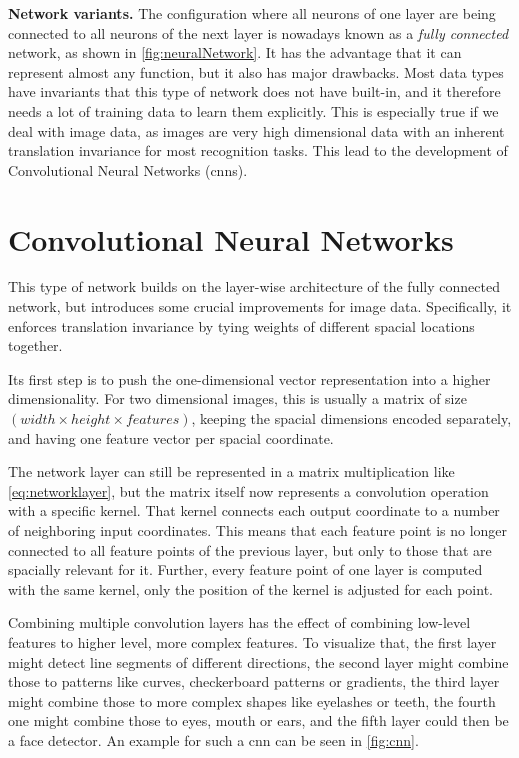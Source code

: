 \textbf{Network variants.} The configuration where all neurons of one layer are being connected to all neurons of the next layer is nowadays known as a \emph{fully connected} network, as shown in \cref{fig:neuralNetwork}. It has the advantage that it can represent almost any function, but it also has major drawbacks. Most data types have invariants that this type of network does not have built-in, and it therefore needs a lot of training data to learn them explicitly. This is especially true if we deal with image data, as images are very high dimensional data with an inherent translation invariance for most recognition tasks. This lead to the development of Convolutional Neural Networks (\glspl{cnn}).

\section{Convolutional Neural Networks}
This type of network builds on the layer-wise architecture of the fully connected network, but introduces some crucial improvements for image data. Specifically, it enforces translation invariance by tying weights of different spacial locations together.

Its first step is to push the one-dimensional vector representation into a higher dimensionality. For two dimensional images, this is usually a matrix of size $(width \times height \times features)$, keeping the spacial dimensions encoded separately, and having one feature vector per spacial coordinate.

The network layer can still be represented in a matrix multiplication like \cref{eq:networklayer}, but the matrix itself now represents a convolution operation with a specific kernel. That kernel connects each output coordinate to a number of neighboring input coordinates. This means that each feature point is no longer connected to all feature points of the previous layer, but only to those that are spacially relevant for it. Further, every feature point of one layer is computed with the same kernel, only the position of the kernel is adjusted for each point. 

Combining multiple convolution layers has the effect of combining low-level features to higher level, more complex features. To visualize that, the first layer might detect line segments of different directions, the second layer might combine those to patterns like curves, checkerboard patterns or gradients, the third layer might combine those to more complex shapes like eyelashes or teeth, the fourth one might combine those to eyes, mouth or ears, and the fifth layer could then be a face detector. An example for such a \gls{cnn} can be seen in \cref{fig:cnn}.

